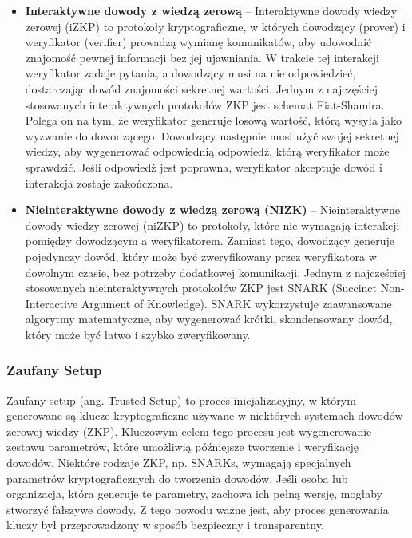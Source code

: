 \documentclass{article}
\begin{document}
\begin{itemize}
    \item \textbf{Interaktywne dowody z wiedzą zerową} – Interaktywne dowody wiedzy zerowej (iZKP) to protokoły kryptograficzne, w których dowodzący (prover) i weryfikator (verifier) prowadzą wymianę komunikatów, aby udowodnić znajomość pewnej informacji bez jej ujawniania. 
    W trakcie tej interakcji weryfikator zadaje pytania, a dowodzący musi na nie odpowiedzieć, dostarczając dowód znajomości sekretnej wartości. Jednym z najczęściej stosowanych interaktywnych protokołów ZKP jest schemat Fiat-Shamira. Polega on na tym, że weryfikator generuje losową wartość, którą wysyła jako wyzwanie do dowodzącego. Dowodzący następnie musi użyć swojej sekretnej wiedzy, aby wygenerować odpowiednią odpowiedź, którą weryfikator może sprawdzić. 
    Jeśli odpowiedź jest poprawna, weryfikator akceptuje dowód i interakcja zostaje zakończona. 
    
    \item \textbf{Nieinteraktywne dowody z wiedzą zerową (NIZK)} – Nieinteraktywne dowody wiedzy zerowej (niZKP) to protokoły, które nie wymagają interakcji pomiędzy dowodzącym a weryfikatorem. 
    Zamiast tego, dowodzący generuje pojedynczy dowód, 
    który może być zweryfikowany przez weryfikatora w dowolnym czasie, bez potrzeby dodatkowej komunikacji. 
    Jednym z najczęściej stosowanych nieinteraktywnych protokołów ZKP jest SNARK (Succinct Non-Interactive Argument of Knowledge). 
    SNARK wykorzystuje zaawansowane algorytmy matematyczne, aby wygenerować krótki, 
    skondensowany dowód, który może być łatwo i szybko zweryfikowany. 
\end{itemize}

\subsubsection{Zaufany Setup \cite{trusted_setup_panther}}
Zaufany setup (ang. Trusted Setup) to proces inicjalizacyjny, w którym generowane są klucze kryptograficzne używane w niektórych systemach dowodów zerowej wiedzy (ZKP). 
Kluczowym celem tego procesu jest wygenerowanie zestawu parametrów, które umożliwią późniejsze tworzenie i weryfikację dowodów.
Niektóre rodzaje ZKP, np. SNARKs, wymagają specjalnych parametrów kryptograficznych do tworzenia dowodów. Jeśli osoba lub organizacja, która generuje te parametry, zachowa ich pełną wersję, mogłaby stworzyć fałszywe dowody. 
Z tego powodu ważne jest, aby proces generowania kluczy był przeprowadzony w sposób bezpieczny i transparentny.
\end{document}
